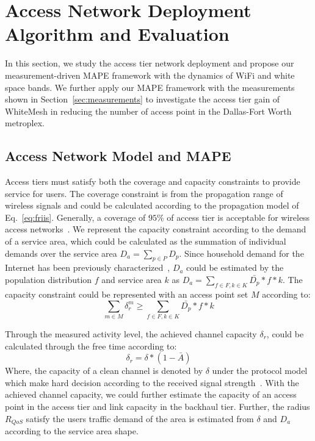 \section{Access Network Deployment Algorithm and Evaluation}
\label{sec:winmee}

In this section, we study the access tier network deployment and propose our measurement-driven MAPE framework with the dynamics 
of WiFi and white space bands. We further apply our MAPE framework with the measurements shown in Section~\ref{sec:measurements}
to investigate the access tier gain of WhiteMesh in reducing the number of access point in the Dallas-Fort Worth metroplex.

\subsection{Access Network Model and MAPE} 
\label{subsec:winmeemodel}


Access tiers must satisfy both the coverage and capacity constraints to provide service for users.
The coverage constraint is from the propagation range of wireless signals and could be calculated 
according to the propagation model of Eq.~\ref{eq:friis}. 
Generally, a coverage of $95\%$ of access tier is acceptable for wireless access 
networks~\cite{robinson2010deploying}. We represent the capacity 
constraint according to the demand of a service area, which could be calculated as the 
summation of individual demands over the service area $D_a=\sum\limits_{p\in P} D_p$. Since household demand 
for the Internet has been previously characterized~\cite{rosston2011household}, $D_a$ could be estimated by the 
population distribution $f$ and service area $k$ as $D_a=\sum\limits_{f \in F,k \in K}\bar{D_p}*f*k$. The capacity 
constraint could be represented with an access point set $M$ according to:
\begin{equation}
\label{eq:nlbound}
\sum_{m \in M}\delta_r^m \ge \sum_{f \in F,k \in K}\bar{D_p}*f*k
\end{equation}

Through the measured activity level, the achieved channel capacity $\delta_r$, could be calculated through the
free time according to:
\begin{equation}
\label{eq:intercap}
\delta_r=\delta*(1-\bar{A})
\end{equation}
Where, the capacity of a clean channel is denoted by $\delta$ under the protocol model which make hard decision 
according to the received signal strength~\cite{gupta2000capacity}. 
With the achieved channel capacity, we could further estimate the capacity of an access point in the access 
tier and link capacity in the backhaul tier.
Further, the radius $R_{QoS}$ satisfy the users traffic demand of the area is estimated from $\delta$ and $D_a$ 
according to the service area shape.

